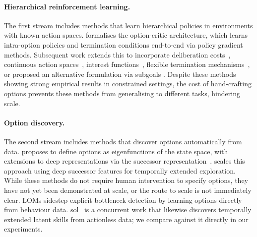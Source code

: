 \documentclass{article}
\theoremstyle{postulate}
\begin{document}
\paragraph{Hierarchical reinforcement learning.}
The first stream includes methods that learn hierarchical policies in environments with known action spaces.
\citet{bacon2017option} formalises the option-critic architecture, which learns intra-option policies and termination conditions end-to-end via policy gradient methods.
Subsequent work extends this to incorporate deliberation costs~\citep{harb2018deliberation}, continuous action spaces~\citep{klissarov2017options}, interest functions~\citep{khetarpal2020options}, flexible termination mechanisms~\citep{klissarov2021flexible}, or proposed an alternative formulation via subgoals \citep{vezhnevets2017feudal,nachum2018hiro}.
Despite these methods showing strong empirical results in constrained settings, the cost of hand-crafting options prevents these methods from generalising to different tasks, hindering scale.

\paragraph{Option discovery.}
The second stream includes methods that discover options automatically from data.
\citet{machado2017laplacian} proposes to define options as eigenfunctions of the state space, with extensions to deep representations via the successor representation~\citep{machado2018eigenoption}.
\citet{klissarov2023dceo} scales this approach using deep successor features for temporally extended exploration.
While these methods do not require human intervention to specify options, they have not yet been demonstrated at scale, or the route to scale is not immediately clear.
LOMs sidestep explicit bottleneck detection by learning options directly from behaviour data.
\gls{sol}~\citep{klissarov2025sol} is a concurrent work that likewise discovers temporally extended latent skills from actionless data; we compare against it directly in our experiments.
\end{document}
